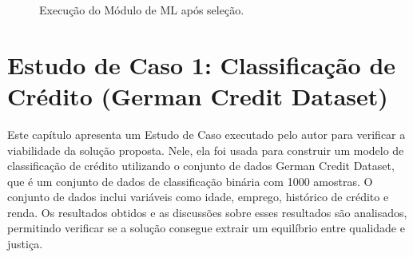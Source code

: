 \documentclass[portugues]{ic-tese}
\begin{document}
\begin{figure}[H]
    \centering
    \caption{Execução do Módulo de ML após seleção.}
    \label{fig:pipelineAutonomoResultado}
\end{figure}

\chapter{Estudo de Caso 1: Classificação de Crédito (German Credit Dataset)}

Este capítulo apresenta um Estudo de Caso executado pelo autor para verificar a viabilidade da solução proposta. Nele, ela foi usada para construir um modelo de classificação de crédito utilizando o conjunto de dados German Credit Dataset, que é um conjunto de dados de classificação binária com 1000 amostras. O conjunto de dados inclui variáveis como idade, emprego, histórico de crédito e renda. Os resultados obtidos e as discussões sobre esses resultados são analisados, permitindo verificar se a solução consegue extrair um equilíbrio entre qualidade e justiça.
\end{document}
